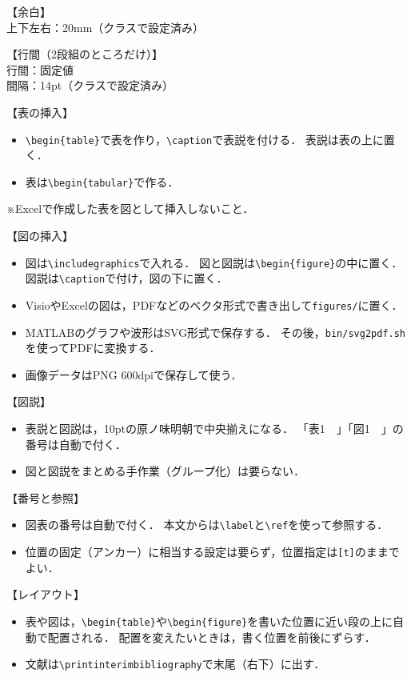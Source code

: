 \documentclass{classes/interim_presentation}
\newenvironment{akablock}{\par\color{red}\setlength{\parindent}{0pt}\setlength{\parskip}{.25\baselineskip}}{\par}
\newcommand{\cs}[1]{\texttt{\textbackslash #1}}
\newcommand{\env}[1]{\texttt{\textbackslash begin\{#1\}}}
\begin{document}
\begin{akablock}
    【余白】\\
    上下左右：20mm（クラスで設定済み）

    【行間（2段組のところだけ）】\\
    行間：固定値\\
    間隔：14pt（クラスで設定済み）

    【表の挿入】
    \begin{itemize}
        \item \env{table}で表を作り，\cs{caption}で表説を付ける．
        表説は表の上に置く．
        \item 表は\env{tabular}で作る．
    \end{itemize}
    ※Excelで作成した表を図として挿入しないこと．

    【図の挿入】
    \begin{itemize}
        \item 図は\cs{includegraphics}で入れる．
        図と図説は\env{figure}の中に置く．
        図説は\cs{caption}で付け，図の下に置く．
        \item VisioやExcelの図は，PDFなどのベクタ形式で書き出して\texttt{figures/}に置く．
        \item MATLABのグラフや波形はSVG形式で保存する．
        その後，\texttt{bin/svg2pdf.sh}を使ってPDFに変換する．
        \item 画像データはPNG 600dpiで保存して使う．
    \end{itemize}

    【図説】
    \begin{itemize}
        \item 表説と図説は，10ptの原ノ味明朝で中央揃えになる．
        「表1　」「図1　」の番号は自動で付く．
        \item 図と図説をまとめる手作業（グループ化）は要らない．
    \end{itemize}

    【番号と参照】
    \begin{itemize}
        \item 図表の番号は自動で付く．
        本文からは\cs{label}と\cs{ref}を使って参照する．
        \item 位置の固定（アンカー）に相当する設定は要らず，位置指定は\texttt{[t]}のままでよい．
    \end{itemize}

    【レイアウト】
    \begin{itemize}
        \item 表や図は，\env{table}や\env{figure}を書いた位置に近い段の上に自動で配置される．
        配置を変えたいときは，書く位置を前後にずらす．
        \item 文献は\cs{printinterimbibliography}で末尾（右下）に出す．
    \end{itemize}


\end{akablock}
\end{document}
